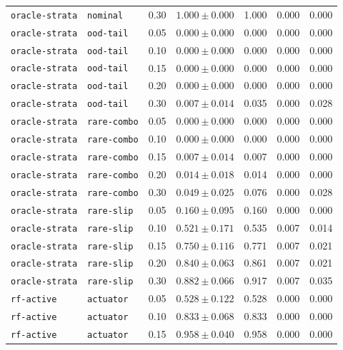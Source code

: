 \documentclass{article}
\begin{document}
\begin{center}
\begin{tabular}{lllcccc}
\texttt{oracle-strata} & \texttt{nominal} & 0.30 & $1.000 \pm 0.000$ & 1.000 & 0.000 & 0.000 \\
\texttt{oracle-strata} & \texttt{ood-tail} & 0.05 & $0.000 \pm 0.000$ & 0.000 & 0.000 & 0.000 \\
\texttt{oracle-strata} & \texttt{ood-tail} & 0.10 & $0.000 \pm 0.000$ & 0.000 & 0.000 & 0.000 \\
\texttt{oracle-strata} & \texttt{ood-tail} & 0.15 & $0.000 \pm 0.000$ & 0.000 & 0.000 & 0.000 \\
\texttt{oracle-strata} & \texttt{ood-tail} & 0.20 & $0.000 \pm 0.000$ & 0.000 & 0.000 & 0.000 \\
\texttt{oracle-strata} & \texttt{ood-tail} & 0.30 & $0.007 \pm 0.014$ & 0.035 & 0.000 & 0.028 \\
\texttt{oracle-strata} & \texttt{rare-combo} & 0.05 & $0.000 \pm 0.000$ & 0.000 & 0.000 & 0.000 \\
\texttt{oracle-strata} & \texttt{rare-combo} & 0.10 & $0.000 \pm 0.000$ & 0.000 & 0.000 & 0.000 \\
\texttt{oracle-strata} & \texttt{rare-combo} & 0.15 & $0.007 \pm 0.014$ & 0.007 & 0.000 & 0.000 \\
\texttt{oracle-strata} & \texttt{rare-combo} & 0.20 & $0.014 \pm 0.018$ & 0.014 & 0.000 & 0.000 \\
\texttt{oracle-strata} & \texttt{rare-combo} & 0.30 & $0.049 \pm 0.025$ & 0.076 & 0.000 & 0.028 \\
\texttt{oracle-strata} & \texttt{rare-slip} & 0.05 & $0.160 \pm 0.095$ & 0.160 & 0.000 & 0.000 \\
\texttt{oracle-strata} & \texttt{rare-slip} & 0.10 & $0.521 \pm 0.171$ & 0.535 & 0.007 & 0.014 \\
\texttt{oracle-strata} & \texttt{rare-slip} & 0.15 & $0.750 \pm 0.116$ & 0.771 & 0.007 & 0.021 \\
\texttt{oracle-strata} & \texttt{rare-slip} & 0.20 & $0.840 \pm 0.063$ & 0.861 & 0.007 & 0.021 \\
\texttt{oracle-strata} & \texttt{rare-slip} & 0.30 & $0.882 \pm 0.066$ & 0.917 & 0.007 & 0.035 \\
\texttt{rf-active} & \texttt{actuator} & 0.05 & $0.528 \pm 0.122$ & 0.528 & 0.000 & 0.000 \\
\texttt{rf-active} & \texttt{actuator} & 0.10 & $0.833 \pm 0.068$ & 0.833 & 0.000 & 0.000 \\
\texttt{rf-active} & \texttt{actuator} & 0.15 & $0.958 \pm 0.040$ & 0.958 & 0.000 & 0.000 \\

\end{tabular}
\end{center}
\end{document}
